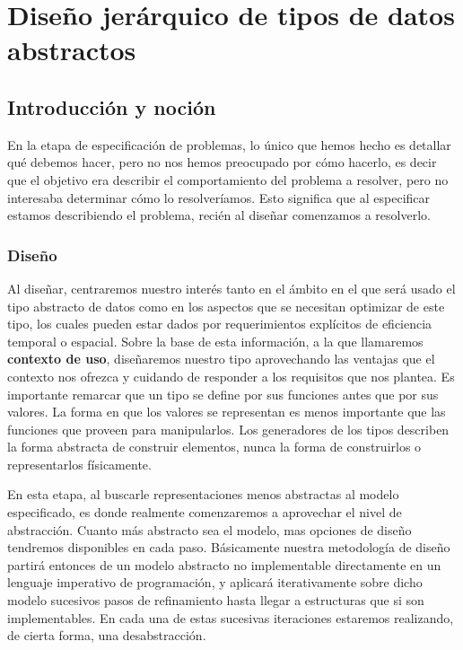 \documentclass[10pt, a4paper]{report}
\begin{document}
\newpage
\chapter{Dise\~no jer\'arquico de tipos de datos abstractos}

\section{Introducci\'on y noci\'on}

En la etapa de especificaci\'on de problemas, lo \'unico que hemos hecho es detallar qu\'e debemos hacer, pero no nos hemos preocupado por c\'omo hacerlo, es decir que el objetivo era describir el comportamiento del problema a resolver, pero no interesaba determinar c\'omo lo resolver\'iamos. Esto significa que al especificar estamos describiendo el problema, reci\'en al dise\~nar comenzamos a resolverlo.

\subsection{Dise\~no}

Al dise\~nar, centraremos nuestro inter\'es tanto en el \'ambito en el que ser\'a usado el tipo abstracto de datos como en los aspectos que se necesitan optimizar de este tipo, los cuales pueden estar dados por requerimientos expl\'icitos de eficiencia temporal o espacial. Sobre la base de esta informaci\'on, a la que llamaremos \textbf{contexto de uso}, dise\~naremos nuestro tipo aprovechando las ventajas que el contexto nos ofrezca y cuidando de responder a los requisitos que nos plantea. Es importante remarcar que un tipo se define por sus funciones antes que por sus valores. La forma en que los valores se representan es menos importante que las funciones que proveen para manipularlos. Los generadores de los tipos describen la forma abstracta de construir elementos, nunca la forma de construirlos o representarlos f\'isicamente.

En esta etapa, al buscarle representaciones menos abstractas al modelo especificado, es donde realmente comenzaremos a aprovechar el nivel de abstracci\'on. Cuanto m\'as abstracto sea el modelo, mas opciones de dise\~no tendremos disponibles en cada paso. B\'asicamente nuestra metodolog\'ia de dise\~no partir\'a entonces de un modelo abstracto no implementable directamente en un lenguaje imperativo de programaci\'on, y aplicar\'a iterativamente sobre dicho modelo sucesivos pasos de refinamiento hasta llegar a estructuras que si son implementables. En cada una de estas sucesivas iteraciones estaremos realizando, de cierta forma, una desabstracci\'on.
\end{document}
